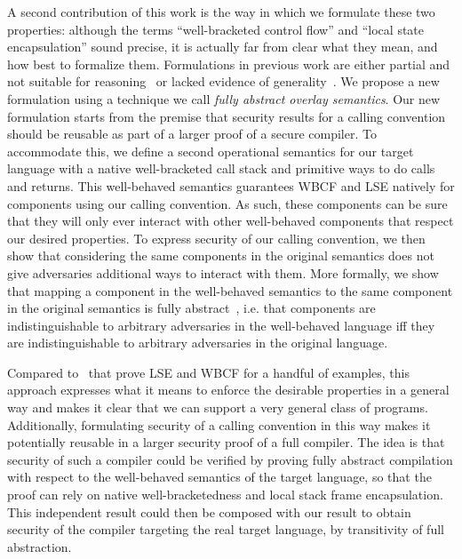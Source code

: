 \documentclass[acmsmall,review,showframe]{acmart}\settopmatter{printfolios=true,printccs=false,printacmref=false}
\begin{document}
A second contribution of this work is the way in which we formulate these two properties: although the terms ``well-bracketed control flow'' and ``local state encapsulation'' sound precise, it is actually far from clear what they mean, and how best to formalize them.
Formulations in previous work are either partial and not suitable for reasoning~\cite{abadi_control-flow_2005} or lacked evidence of generality~\cite{skorstengaard_reasoning_2017}.
We propose a new formulation using a technique we call {\itshape fully abstract overlay semantics}.
Our new formulation starts from the premise that security results for a calling convention should be reusable as part of a larger proof of a secure compiler.
To accommodate this, we define a second operational semantics for our target language with a native well-bracketed call stack and primitive ways to do calls and returns.
This well-behaved semantics guarantees WBCF and LSE natively for components using our calling convention.
As such, these components can be sure that they will only ever interact with other well-behaved components that respect our desired properties.
To express security of our calling convention, we then show that considering the same components in the original semantics does not give adversaries additional ways to interact with them. 
More formally, we show that mapping a component in the well-behaved semantics to the same component in the original semantics is fully abstract~\cite{abadi_protection_1999}, i.e. that components are indistinguishable to arbitrary adversaries in the well-behaved language iff they are indistinguishable to arbitrary adversaries in the original language.

Compared to~\citet{skorstengaard_reasoning_2017} that prove LSE and WBCF for a handful of examples,
this approach expresses what it means to enforce the desirable properties in a general way and makes it clear that we can support a very general class of programs.
Additionally, formulating security of a calling convention in this way makes it potentially reusable in a larger security proof of a full compiler.
The idea is that security of such a compiler could be verified by proving fully abstract compilation with respect to the well-behaved semantics of the target language, so that the proof can rely on native well-bracketedness and local stack frame encapsulation.
This independent result could then be composed with our result to obtain security of the compiler targeting the real target language, by transitivity of full abstraction.
\end{document}
